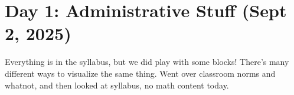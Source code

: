 \section{Day 1: Administrative Stuff (Sept 2, 2025)}

Everything is in the syllabus, but we did play with some blocks! There's many different ways to visualize the same thing. Went over classroom norms and whatnot, and then looked at syllabus, no math content today.

